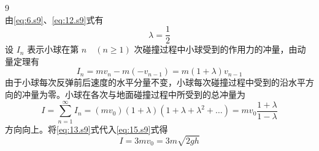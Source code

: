\begin{solution}{9}
\begin{equation}
\label{eq:12.s9}
\end{equation}
由\eqref{eq:6.s9}、\eqref{eq:12.s9}式有
\begin{equation}
\lambda = \frac {1}{2}
\label{eq:13.s9}
\end{equation}
设 $I_{n}$ 表示小球在第 $n\quad(n\geq1)$ 次碰撞过程中小球受到的作用力的冲量，由动量定理有
\begin{equation}
I _ {n} = m v _ {n} - m (- v _ {n - 1}) = m (1 + \lambda) v _ {n - 1}
\label{eq:14.s9}
\end{equation}
由于小球每次反弹前后速度的水平分量不变，小球每次碰撞过程中受到的沿水平方向的冲量为零。小球在各次与地面碰撞过程中所受到的总冲量为
\begin{equation}
I = \sum_ {n = 1} ^ {\infty} I _ {n} = (m v _ {0}) (1 + \lambda) (1 + \lambda + \lambda^ {2} + \dots) = m v _ {0} \frac {1 + \lambda}{1 - \lambda}
\label{eq:15.s9}
\end{equation}
方向向上。将\eqref{eq:13.s9}式代入\eqref{eq:15.s9}式得
\begin{equation}
I = 3 m v _ {0} = 3 m \sqrt {2 g h}
\label{eq:16.s9}
\end{equation}
\end{solution}
